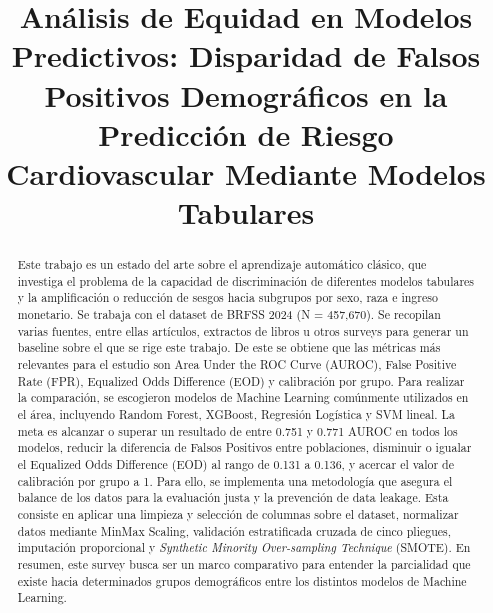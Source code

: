 \documentclass[conference]{IEEEtran}
\begin{document}
\renewcommand{\abstractname}{Resumen (Preliminar)}
\def\IEEEkeywordsname{Palabras Clave}
\renewcommand{\tablename}{Tabla}

\title{\LARGE Análisis de Equidad en Modelos Predictivos: Disparidad de Falsos Positivos Demográficos en la Predicción de Riesgo Cardiovascular Mediante Modelos Tabulares}

\author{
}

\maketitle

\begin{abstract}
Este trabajo es un estado del arte sobre el aprendizaje automático clásico, que investiga el problema de la capacidad de discriminación de diferentes modelos tabulares y la amplificación o reducción de sesgos hacia subgrupos por sexo, raza e ingreso monetario. Se trabaja con el dataset de BRFSS 2024 (N = 457,670). Se recopilan varias fuentes, entre ellas artículos, extractos de libros u otros surveys para generar un baseline sobre el que se rige este trabajo. De este se obtiene que las métricas más relevantes para el estudio son Area Under the ROC Curve (AUROC), False Positive Rate (FPR), Equalized Odds Difference (EOD) y calibración por grupo. Para realizar la comparación, se escogieron modelos de Machine Learning comúnmente utilizados en el área, incluyendo Random Forest, XGBoost, Regresión Logística y SVM lineal. La meta es alcanzar o superar un resultado de entre 0.751 y 0.771 AUROC en todos los modelos, reducir la diferencia de Falsos Positivos entre poblaciones, disminuir o igualar el Equalized Odds Difference (EOD) al rango de 0.131 a 0.136, y acercar el valor de calibración por grupo a 1. Para ello, se implementa una metodología que asegura el balance de los datos para la evaluación justa y la prevención de data leakage. Esta consiste en aplicar una limpieza y selección de columnas sobre el dataset, normalizar datos mediante MinMax Scaling, validación estratificada cruzada de cinco pliegues, imputación proporcional y \textit{Synthetic Minority Over-sampling Technique} (SMOTE). En resumen, este survey busca ser un marco comparativo para entender la parcialidad que existe hacia determinados grupos demográficos entre los distintos modelos de Machine Learning.
\end{abstract}
\end{document}
